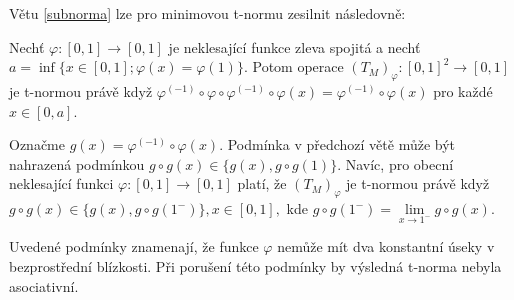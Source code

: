 V\v etu \ref{subnorma} lze pro minimovou t-normu zesilnit n\'asledovn\v e:
\begin{sentence}
    \cite{habilitace}
Nech\v t $\varphi:[0,1]\rightarrow [0,1]$ je neklesaj\'ic\'i funkce zleva spojitá a
nech\v t $a=\inf\{x \in [0,1]; \varphi (x)=\varphi (1)\}.$ Potom operace $(T_M)_{\varphi}:[0,1]^2\rightarrow
[0,1]$ je t-normou práv\v e kdy\v z $\varphi^{(-1)}
\circ \varphi \circ \varphi^{(-1)} \circ \varphi (x)=\varphi^{(-1)}
\circ \varphi (x)$ pro každé $x \in [0,a]$.
\end{sentence}
\begin{remark}
Označme $g(x)=\varphi^{(-1)} \circ \varphi (x)$. Podm\'inka
v p\v redchoz\'i v\v et\v e m\r u\v ze b\'yt nahrazen\'a podm\'inkou $g \circ g(x) \in
\{g(x),g \circ g(1)\}.$ Nav\'ic, pro obecn\'i neklesaj\'ic\'i funkci $\varphi :[0,1]
\rightarrow [0,1]$ platí, že $(T_M)_\varphi$ je t-normou pr\'av\v e kdy\v z
 $g \circ g(x) \in \{g(x), g \circ g(1^-)\}, x \in [0,1],$ kde
$g \circ g(1^-)= \lim\limits_{x\rightarrow 1^-} g \circ g(x).$
\end{remark}

Uveden\'e podm\'inky znamenaj\'i, \v ze funkce $\varphi$ nem\r u\v ze m\'it dva konstantn\'i \'useky v bezprost\v redn\'i bl\'izkosti. P\v ri poru\v sen\'i t\'eto podm\'inky by v\'ysledn\'a t-norma nebyla asociativn\'i.
\bigskip


